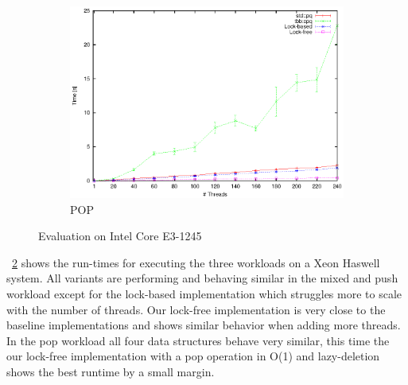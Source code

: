 \begin{figure}[t]
\begin{subfigure}[b]{0.3\textwidth}
		\centering
		\includegraphics[width=\textwidth]{../plots/i7_pop/runtime_pop_i7}
		\caption{POP}
		\label{fig:i7_pop}
	\end{subfigure}
	\caption{Evaluation on Intel Core E3-1245}
	\label{fig:eval_i7}
\end{figure}
\figurename~\ref{fig:eval_i7} shows the run-times for executing the three workloads on a Xeon Haswell system. All variants are performing and behaving similar in the mixed and push workload except for the lock-based implementation which struggles more to scale with the number of threads. Our lock-free implementation is very close to the baseline implementations and shows similar behavior when adding more threads. In the pop workload all four data structures behave very similar, this time the our lock-free implementation with a pop operation in O(1) and lazy-deletion shows the best runtime by a small margin.


